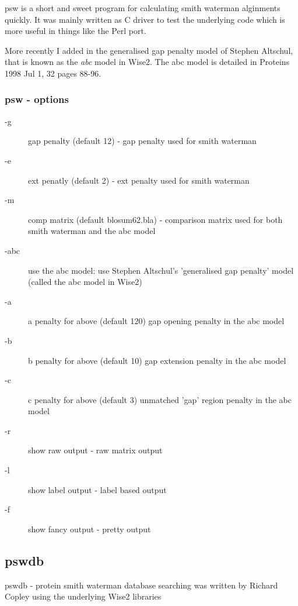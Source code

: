 \documentclass{article}
\begin{document}
psw is a short and sweet program for calculating smith waterman alginments
quickly. It was mainly written as C driver to test the underlying code which
is more useful in things like the Perl port. 

More recently I added in the generalised gap penalty model of Stephen
Altschul, that is known as the \emph{abc} model in Wise2.  The abc
model is detailed in Proteins 1998 Jul 1, 32 pages 88-96.

\subsubsection{psw - options}
\begin{description}
\item[-g] gap penalty (default 12) - gap penalty used for smith waterman
\item[-e] ext penatly (default 2) - ext penalty used for smith waterman
\item[-m] comp matrix (default blosum62.bla) - comparison matrix used for
both smith waterman and the abc model
\item[-abc] use the abc model: use Stephen Altschul's 'generalised gap penalty'
model (called the abc model in Wise2)
\item[-a]   a penalty for above (default 120) gap opening penalty in the abc model
\item[-b]   b penalty for above (default 10) gap extension penalty in the abc model
\item[-c]   c penalty for above (default 3) unmatched 'gap' region penalty in the abc model
\item[-r] show raw output - raw matrix output
\item[-l] show label output - label based output
\item[-f] show fancy output - pretty output
\end{description}

\subsection{pswdb}

pswdb - protein smith waterman database searching was written by Richard Copley using
the underlying Wise2 libraries
\end{document}
